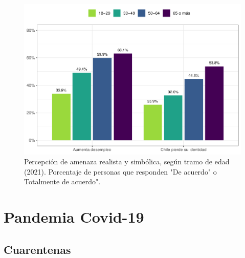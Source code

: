 \documentclass[
  12pt,
]{book}
\begin{document}
\begin{figure}

{\centering \includegraphics{reporte-elsoc_files/figure-latex/amen-edad-1} 

}

\caption{Percepción de amenaza realista y simbólica, según tramo de edad (2021). Porcentaje de personas que responden "De acuerdo" o Totalmente de acuerdo".}\label{fig:amen-edad}
\end{figure}

\hypertarget{pandemia-covid-19}{%
\chapter{Pandemia Covid-19}\label{pandemia-covid-19}}

\hypertarget{cuarentenas}{%
\section{Cuarentenas}\label{cuarentenas}}
\end{document}
